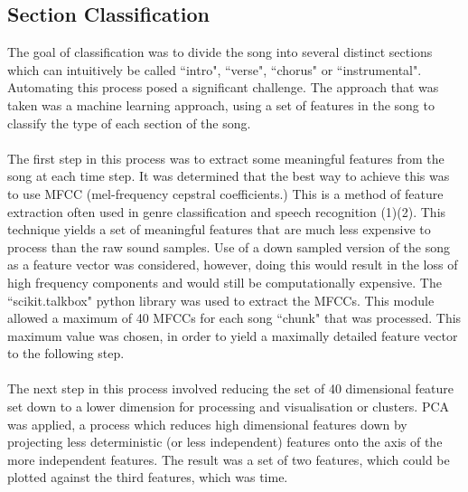 \subsection{Section Classification}
The goal of classification was to divide the song into several distinct sections which can intuitively be called ``intro", ``verse", ``chorus" or ``instrumental". Automating this process posed a significant challenge. The approach that was taken was a machine learning approach, using a set of features in the song to classify the type of each section of the song. \\
\\
The first step in this process was to extract some meaningful features from the song at each time step. It was determined that the best way to achieve this was to use MFCC (mel-frequency cepstral coefficients.) This is a method of feature extraction often used in genre classification and speech recognition (1)(2). This technique yields a set of meaningful features that are much less expensive to process than the raw sound samples. Use of a down sampled version of the song as a feature vector was considered, however, doing this would result in the loss of high frequency components and would still be computationally expensive. The ``scikit.talkbox" python library was used to extract the MFCCs. This module allowed a maximum of 40 MFCCs for each song ``chunk" that was processed. This maximum value was chosen, in order to yield a maximally detailed feature vector to the following step.\\
\\
The next step in this process involved reducing the set of 40 dimensional feature set down to a lower dimension for processing and visualisation or clusters. PCA was applied, a process which reduces high dimensional features down by projecting less deterministic (or less independent) features onto the axis of the more independent features. The result was a set of two features, which could be plotted against the third features, which was time. \\
\\
